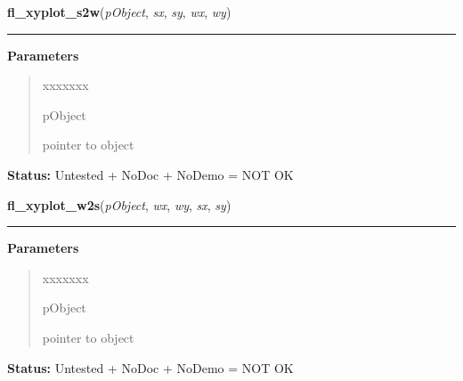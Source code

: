 \hspace{.8\funcindent}\begin{boxedminipage}{\funcwidth}

    \raggedright \textbf{fl\_xyplot\_s2w}(\textit{pObject}, \textit{sx}, \textit{sy}, \textit{wx}, \textit{wy})

    \vspace{-1.5ex}

    \rule{\textwidth}{0.5\fboxrule}
\setlength{\parskip}{2ex}
\setlength{\parskip}{1ex}
      \textbf{Parameters}
      \vspace{-1ex}

      \begin{quote}
        \begin{Ventry}{xxxxxxx}

          \item[pObject]

          pointer to object

        \end{Ventry}

      \end{quote}

\textbf{Status:} Untested + NoDoc + NoDemo = NOT OK



    \end{boxedminipage}

    \label{xformslib:library:fl_xyplot_w2s}

    \vspace{0.5ex}

\hspace{.8\funcindent}\begin{boxedminipage}{\funcwidth}

    \raggedright \textbf{fl\_xyplot\_w2s}(\textit{pObject}, \textit{wx}, \textit{wy}, \textit{sx}, \textit{sy})

    \vspace{-1.5ex}

    \rule{\textwidth}{0.5\fboxrule}
\setlength{\parskip}{2ex}
\setlength{\parskip}{1ex}
      \textbf{Parameters}
      \vspace{-1ex}

      \begin{quote}
        \begin{Ventry}{xxxxxxx}

          \item[pObject]

          pointer to object

        \end{Ventry}

      \end{quote}

\textbf{Status:} Untested + NoDoc + NoDemo = NOT OK



    \end{boxedminipage}

